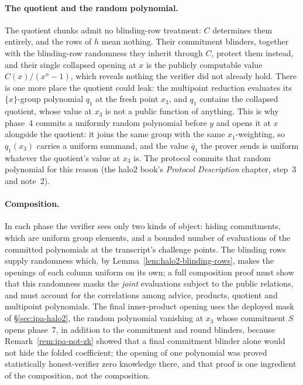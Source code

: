 \documentclass[11pt,a4paper]{article}
\theoremstyle{definition}
\begin{document}
\paragraph{The quotient and the random polynomial.}
The quotient chunks admit no blinding-row treatment: $C$ determines them
entirely, and the rows of $h$ mean nothing. Their commitment blinders,
together with the blinding-row randomness they inherit through $C$,
protect them instead, and their single collapsed opening at $x$ is the
publicly computable value $C(x)/(x^{n} - 1)$, which reveals nothing the
verifier did not already hold. There is one more place the quotient could
leak: the multipoint reduction evaluates its $\{x\}$-group polynomial
$q_1$ at the fresh point $x_3$, and $q_1$ contains the collapsed quotient,
whose value at $x_3$ is not a public function of anything. This is why
phase~4 commits a uniformly random polynomial before $y$ and opens it at
$x$ alongside the quotient: it joins the same group with the same
$x_1$-weighting, so $q_1(x_3)$ carries a uniform summand, and the value
$\bar q_1$ the prover sends is uniform whatever the quotient's value at
$x_3$ is. The protocol commits that random polynomial for this reason
(the halo2 book's \emph{Protocol Description} chapter, step~3 and
note~2).

\paragraph{Composition.}
In each phase the verifier sees only two kinds of object: hiding
commitments, which are uniform group elements, and a bounded number of
evaluations of the committed polynomials at the transcript's challenge
points. The blinding rows supply randomness which, by
Lemma~\ref{lem:halo2-blinding-rows}, makes the openings of each column
uniform on its own; a full composition proof must show that this
randomness masks the \emph{joint} evaluations subject to the public
relations, and must account for the correlations among advice, products,
quotient and multipoint polynomials. The final inner-product opening
uses the deployed mask of \S\ref{sec:ipa-halo2}, the random polynomial
vanishing at $x_3$ whose commitment $S$ opens phase~7, in addition to
the commitment and round blinders, because Remark~\ref{rem:ipa-not-zk}
showed that a final commitment blinder alone would not hide the folded
coefficient; the opening of one polynomial was proved statistically
honest-verifier zero knowledge there, and that proof is one ingredient
of the composition, not the composition.
\end{document}

